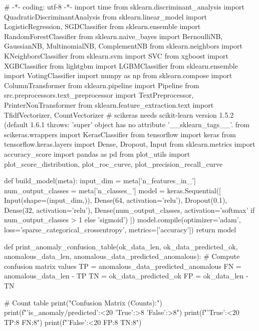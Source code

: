 \begtt {}
# -*- coding: utf-8 -*-
import time
from sklearn.discriminant_analysis import QuadraticDiscriminantAnalysis
from sklearn.linear_model import LogisticRegression, SGDClassifier
from sklearn.ensemble import RandomForestClassifier
from sklearn.naive_bayes import BernoulliNB, GaussianNB, MultinomialNB, ComplementNB
from sklearn.neighbors import KNeighborsClassifier
from sklearn.svm import SVC
from xgboost import XGBClassifier
from lightgbm import LGBMClassifier
from sklearn.ensemble import VotingClassifier
import numpy as np
from sklearn.compose import ColumnTransformer
from sklearn.pipeline import Pipeline
from src.preprocessors.text_preprocessor import TextPreprocessor, PrinterNonTransformer
from sklearn.feature_extraction.text import TfidfVectorizer, CountVectorizer
# scikeras needs scikit-learn version 1.5.2 (default 1.6.1 throws: 'super' object has no attribute '__sklearn_tags__'.
from scikeras.wrappers import KerasClassifier
from tensorflow import keras
from tensorflow.keras.layers import Dense, Dropout, Input
from sklearn.metrics import accuracy_score
import pandas as pd
from plot_utils import plot_score_distribution, plot_roc_curve, plot_precision_recall_curve


def build_model(meta):
    input_dim = meta['n_features_in_']
    num_output_classes = meta['n_classes_']
    model = keras.Sequential([
        Input(shape=(input_dim,)),
        Dense(64, activation='relu'),
        Dropout(0.1),
        Dense(32, activation='relu'),
        Dense(num_output_classes,
              activation='softmax' if num_output_classes > 1 else 'sigmoid')
    ])
    model.compile(optimizer='adam',
                  loss='sparse_categorical_crossentropy', metrics=['accuracy'])
    return model


def print_anomaly_confusion_table(ok_data_len, ok_data_predicted_ok, anomalous_data_len, anomalous_data_predicted_anomalous):
    # Compute confusion matrix values
    TP = anomalous_data_predicted_anomalous
    FN = anomalous_data_len - TP
    TN = ok_data_predicted_ok
    FP = ok_data_len - TN

    # Count table
    print("Confusion Matrix (Counts):")
    print(f"{'is_anomaly/predicted':<20} {'True':>8} {'False':>8}")
    print(f"{'True':<20} {TP:8} {FN:8}")
    print(f"{'False':<20} {FP:8} {TN:8}")


